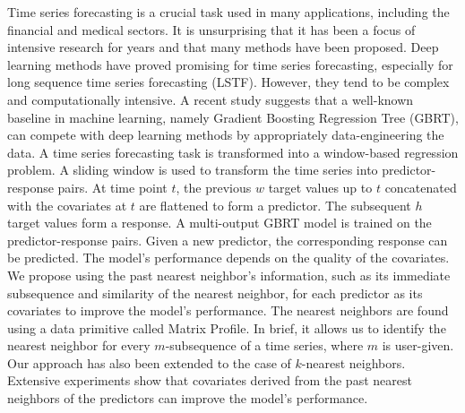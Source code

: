 Time series forecasting is a crucial task used in many applications, including the financial and medical sectors.
It is unsurprising that it has been a focus of intensive research for years and that many methods have been proposed.
%
Deep learning methods have proved promising for time series forecasting, especially for long sequence time series forecasting (LSTF).
However, they tend to be complex and computationally intensive.
%
A recent study suggests that a well-known baseline in machine learning, namely Gradient Boosting Regression Tree (GBRT), can compete with deep learning methods by appropriately data-engineering the data.
A time series forecasting task is transformed into a window-based regression problem.
A sliding window is used to transform the time series into predictor-response pairs.
At time point $t$, the previous $w$ target values up to $t$ concatenated with the covariates at $t$ are flattened to form a predictor.
The subsequent $h$ target values form a response.
A multi-output GBRT model is trained on the predictor-response pairs.
Given a new predictor, the corresponding response can be predicted.
%
The model's performance depends on the quality of the covariates.
%
We propose using the past nearest neighbor's information, such as its immediate subsequence and similarity of the nearest neighbor, for each predictor as its covariates to improve the model's performance.
The nearest neighbors are found using a data primitive called Matrix Profile.
In brief, it allows us to identify the nearest neighbor for every $m$-subsequence of a time series, where $m$ is user-given.
Our approach has also been extended to the case of $k$-nearest neighbors.
%
Extensive experiments show that covariates derived from the past nearest neighbors of the predictors can improve the model's performance.